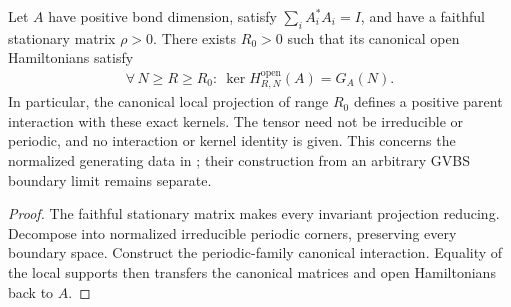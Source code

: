 \begin{lemma}
    \label{thm:faithful_generators_canonical_interaction}
    \leanok
    Let $A$ have positive bond dimension, satisfy $\sum_iA_i^*A_i=I$,
    and have a faithful stationary matrix $\rho>0$.
    There exists $R_0>0$ such that its canonical open Hamiltonians satisfy
    \begin{align}
        \forall\,N\geq R\geq R_0:\ \ker H^{\mathrm{open}}_{R,N}(A)=G_A(N).
    \end{align}
    In particular, the canonical local projection of range $R_0$ defines
    a positive parent interaction with these exact kernels.
    The tensor need not be irreducible or periodic, and no interaction or
    kernel identity is given. This concerns the normalized generating
    data in \cite[Section~3]{Nachtergaele1996Spectral}; their construction
    from an arbitrary GVBS boundary limit remains separate.
\end{lemma}
\begin{proof}\leanok
    The faithful stationary matrix makes every invariant projection reducing.
    Decompose into normalized irreducible periodic corners, preserving every
    boundary space. Construct the periodic-family canonical interaction.
    Equality of the local supports then transfers the canonical matrices
    and open Hamiltonians back to $A$.
\end{proof}

